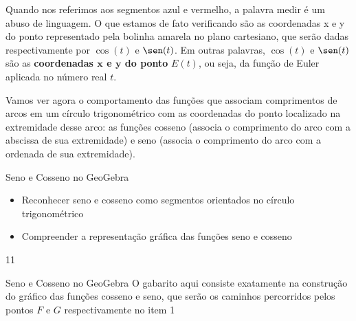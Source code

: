 Quando nos referimos aos segmentos azul e vermelho, a palavra medir é um abuso de linguagem. O que estamos de fato verificando são as coordenadas x e y do ponto representado pela bolinha amarela no plano cartesiano, que serão dadas respectivamente por $\cos(t)$ e $\sen(t)$.  Em outras palavras, $\cos(t)$ e $\sen(t)$ são as \textbf{coordenadas $\bm{x}$ e $\bm{y}$ do ponto} $E(t)$, ou seja, da função de Euler aplicada no número real $t$.

Vamos ver agora o comportamento das funções que associam comprimentos de arcos em um círculo trigonométrico com as coordenadas do ponto localizado na extremidade desse arco: as funções cosseno (associa o comprimento do arco com a abscissa de sua extremidade) e seno (associa o comprimento do arco com a ordenada de sua extremidade).
\clearpage

\def\currentcolor{session1}
\begin{objectives}{Seno e Cosseno no GeoGebra}
{
\begin{itemize}
\item Reconhecer seno e cosseno como segmentos orientados no círculo trigonométrico
\item Compreender a representação gráfica das funções seno e cosseno
\end{itemize}
}{1}{1}
\end{objectives}
\begin{answer}{Seno e Cosseno no GeoGebra}
{
O gabarito aqui consiste exatamente na construção do gráfico das funções cosseno e seno, que serão os caminhos percorridos pelos pontos $F$ e $G$ respectivamente no item 
}{1}
\end{answer}

\label{trig-exp5}

